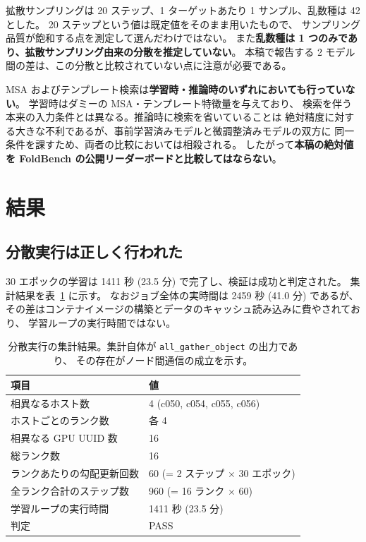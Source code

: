 \documentclass[11pt,a4paper]{article}
\begin{document}
拡散サンプリングは 20 ステップ、1 ターゲットあたり 1 サンプル、乱数種は 42 とした。
20 ステップという値は既定値をそのまま用いたもので、
サンプリング品質が飽和する点を測定して選んだわけではない。
また\textbf{乱数種は 1 つのみであり、拡散サンプリング由来の分散を推定していない}。
本稿で報告する 2 モデル間の差は、この分散と比較されていない点に注意が必要である。

MSA およびテンプレート検索は\textbf{学習時・推論時のいずれにおいても行っていない}。
学習時はダミーの MSA・テンプレート特徴量を与えており、
検索を伴う本来の入力条件とは異なる。推論時に検索を省いていることは
絶対精度に対する大きな不利であるが、事前学習済みモデルと微調整済みモデルの双方に
同一条件を課すため、両者の比較においては相殺される。
したがって\textbf{本稿の絶対値を FoldBench の公開リーダーボードと比較してはならない}。

\section{結果}

\subsection{分散実行は正しく行われた}

30 エポックの学習は 1411 秒 (23.5 分) で完了し、検証は成功と判定された。
集計結果を表~\ref{tab:placement} に示す。
なおジョブ全体の実時間は 2459 秒 (41.0 分) であるが、
その差はコンテナイメージの構築とデータのキャッシュ読み込みに費やされており、
学習ループの実行時間ではない。

\begin{table}[htbp]
\centering
\caption{分散実行の集計結果。集計自体が \texttt{all\_gather\_object} の出力であり、
その存在がノード間通信の成立を示す。}
\label{tab:placement}
\begin{tabular}{ll}
\toprule
項目 & 値 \\
\midrule
相異なるホスト数 & 4 (c050, c054, c055, c056) \\
ホストごとのランク数 & 各 4 \\
相異なる GPU UUID 数 & 16 \\
総ランク数 & 16 \\
ランクあたりの勾配更新回数 & 60 (= 2 ステップ $\times$ 30 エポック) \\
全ランク合計のステップ数 & 960 (= 16 ランク $\times$ 60) \\
学習ループの実行時間 & 1411 秒 (23.5 分) \\
判定 & PASS \\
\bottomrule
\end{tabular}
\end{table}
\end{document}
